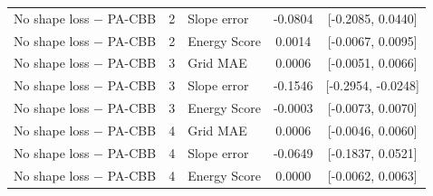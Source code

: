 \begin{table}[t]
\begin{tabular}{lclcc}
No shape loss $-$ PA-CBB & 2 & Slope error & -0.0804 & [-0.2085, 0.0440] \\
No shape loss $-$ PA-CBB & 2 & Energy Score & 0.0014 & [-0.0067, 0.0095] \\
No shape loss $-$ PA-CBB & 3 & Grid MAE & 0.0006 & [-0.0051, 0.0066] \\
No shape loss $-$ PA-CBB & 3 & Slope error & -0.1546 & [-0.2954, -0.0248] \\
No shape loss $-$ PA-CBB & 3 & Energy Score & -0.0003 & [-0.0073, 0.0070] \\
No shape loss $-$ PA-CBB & 4 & Grid MAE & 0.0006 & [-0.0046, 0.0060] \\
No shape loss $-$ PA-CBB & 4 & Slope error & -0.0649 & [-0.1837, 0.0521] \\
No shape loss $-$ PA-CBB & 4 & Energy Score & 0.0000 & [-0.0062, 0.0063] \\
\bottomrule
\end{tabular}
\end{table}
